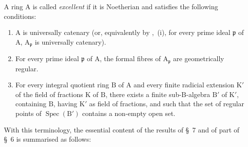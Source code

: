 \begin{definition}[7.8.2]
\label{IV.7.8.2}
A ring $\mathrm{A}$ is called \emph{excellent} if it is Noetherian and satisfies the following conditions:
\begin{enumerate}[label=(\roman*)]
  \item $\mathrm{A}$ is universally catenary \textup{(or, equivalently by ,~(i),} for every prime ideal $\mathfrak{p}$ of $\mathrm{A}$, $\mathrm{A}_\mathfrak{p}$ is universally catenary).
  \item For every prime ideal $\mathfrak{p}$ of $\mathrm{A}$, the formal fibres of $\mathrm{A}_\mathfrak{p}$ are geometrically regular.
  \item For every integral quotient ring $\mathrm{B}$ of $\mathrm{A}$ and every finite radicial extension $\mathrm{K}'$ of the field of fractions $\mathrm{K}$ of $\mathrm{B}$, there exists a finite sub-$\mathrm{B}$-algebra $\mathrm{B}'$ of $\mathrm{K}'$, containing $\mathrm{B}$, having $\mathrm{K}'$ as field of fractions, and such that the set of regular points of $\operatorname{Spec}(\mathrm{B}')$ contains a non-empty open set.
\end{enumerate}
With this terminology, the essential content of the results of \S~7 and of part of \S~6 is summarised as follows:
\end{definition}

